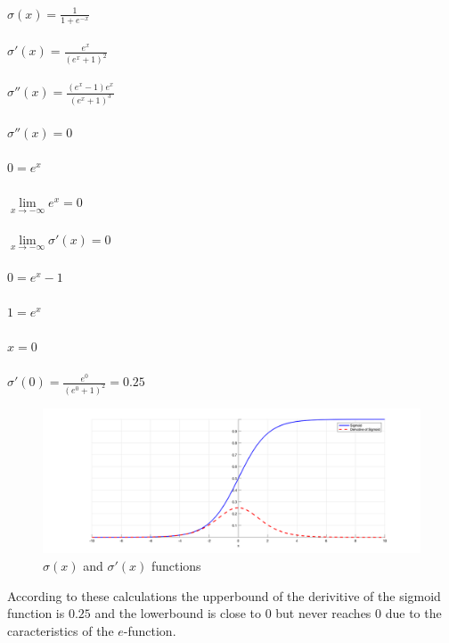 \subsubsection{}
$\sigma(x) = \frac{1}{1 + e^{-x}}$\\\\
$\sigma'(x) = \frac{e^x}{(e^{x} + 1)^2}$\\\\
$\sigma''(x) = \frac{(e^x-1)e^x}{(e^{x} + 1)^3}$\\\\
$\sigma''(x) = 0$\\\\
$0 = e^x$\\\\
$\lim \limits_{x \to -\infty} e^x = 0$\\\\
$\lim \limits_{x \to -\infty} \sigma'(x) = 0$\\\\
$0 = e^x-1$\\\\
$1 = e^x$\\\\
$x = 0$\\\\
$\sigma'(0) = \frac{e^0}{(e^{0} + 1)^2} = 0.25$\\
\begin{figure}[H]
    \centering
    \includegraphics[width=\textwidth]{sigmoid.png}
    \caption{$\sigma(x)$ and $\sigma'(x)$ functions}
\end{figure}

According to these calculations the upperbound of the derivitive of the sigmoid function is $0.25$ and the lowerbound is close to $0$ but never reaches $0$ due to the caracteristics of the $e$-function.
